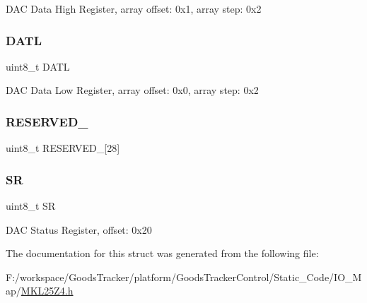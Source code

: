 D\+AC Data High Register, array offset\+: 0x1, array step\+: 0x2 \mbox{\label{struct_d_a_c___mem_map_a906a4999a740a6bc4fd750743203c7a1}} 
\subsubsection{\texorpdfstring{D\+A\+TL}{DATL}}
{\footnotesize\ttfamily uint8\+\_\+t D\+A\+TL}

D\+AC Data Low Register, array offset\+: 0x0, array step\+: 0x2 \mbox{\label{struct_d_a_c___mem_map_abc36545658b11a98b00c51de3a3c5d42}} 
\subsubsection{\texorpdfstring{R\+E\+S\+E\+R\+V\+E\+D\+\_}{RESERVED\_0}}
{\footnotesize\ttfamily uint8\+\_\+t R\+E\+S\+E\+R\+V\+E\+D\+\_\mbox{[}28\mbox{]}}

\mbox{\label{struct_d_a_c___mem_map_a05bb2d07a6ae315af41ebe1bb7cd3d5c}} 
\subsubsection{\texorpdfstring{SR}{SR}}
{\footnotesize\ttfamily uint8\+\_\+t SR}

D\+AC Status Register, offset\+: 0x20 

The documentation for this struct was generated from the following file\+:\begin{DoxyCompactItemize}
\item 
F\+:/workspace/\+Goods\+Tracker/platform/\+Goods\+Tracker\+Control/\+Static\+\_\+\+Code/\+I\+O\+\_\+\+Map/\hyperlink{_m_k_l25_z4_8h}{M\+K\+L25\+Z4.\+h}\end{DoxyCompactItemize}
